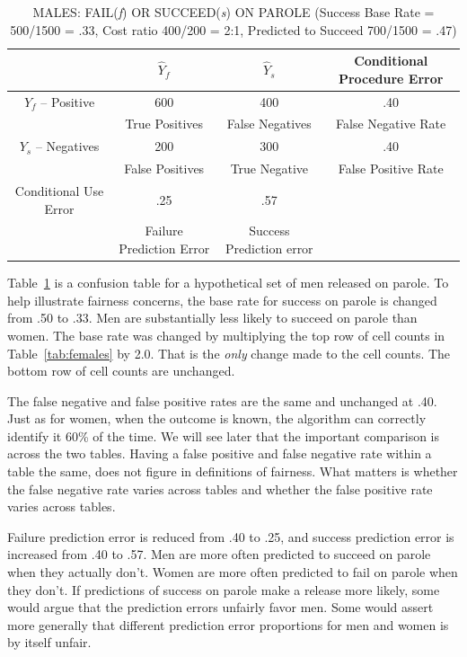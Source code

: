 \documentclass[12pt]{article}
\begin{document}
\maketitle
\begin{table}[htp]
\caption{MALES: FAIL(\textit{f}) OR SUCCEED(\textit{s}) ON PAROLE  (Success Base Rate = 500/1500 = .33, Cost ratio 400/200 = 2:1, Predicted to Succeed 700/1500 = .47)}
\begin{center}
\tiny
\begin{tabular}{|c|c|c|c|}
\hline
      & $\hat{Y}_{f}$ & $\hat{Y}_{s}$ &  Conditional Procedure Error  \\ \hline
 $Y_{f}$ -- Positive  & 600 & 400 & .40 \\
      & True Positives & False Negatives & False  Negative Rate\\   \hline 
 $Y_{s}$  -- Negatives & 200 & 300 & .40 \\
      & False Positives & True Negative & False Positive Rate  \\  \hline
     Conditional Use Error & .25 & .57 & \\ 
      & Failure Prediction Error & Success Prediction error & \\
 \hline
\end{tabular}
\end{center}
\label{tab:males}
\end{table}

Table~\ref{tab:males} is a confusion table for a hypothetical set of men released on parole. To help illustrate fairness concerns, the base rate for success on parole is changed from .50 to .33. Men are substantially less likely to succeed on parole than women. The base rate was changed by multiplying the top row of cell counts in Table~\ref{tab:females} by 2.0. That is the \textit{only} change made to the cell counts. The bottom row of cell counts are unchanged.  

The false negative and false positive rates are the same and unchanged at .40. Just as for women, when the outcome is known, the algorithm can correctly identify it 60\% of the time. We will see later that the important comparison is across the two tables. Having a false positive and false negative rate within a table the same, does not figure in definitions of fairness. What matters is whether the false negative rate varies across tables and whether the false positive rate varies across tables. 

Failure prediction error is reduced from .40 to .25, and success prediction error is increased from .40 to .57. Men are more often predicted to succeed on parole when they actually don't. Women are more often predicted to fail on parole when they don't. If predictions of success on parole make a release more likely, some would argue that the prediction errors unfairly favor men. Some would assert more generally that different prediction error proportions for men and women is by itself unfair. 
\end{document}
